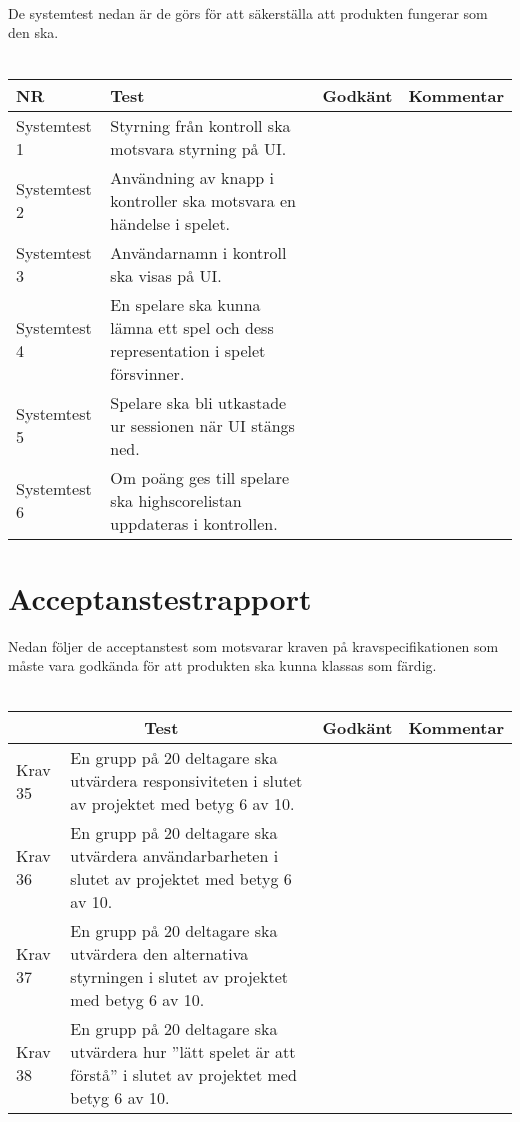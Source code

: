 \documentclass[10pt]{article}
\begin{document}
\\ \\ \\
De systemtest nedan är de görs för att säkerställa att produkten fungerar som den ska.
\\ \\
\noindent
	\begin{tabular}{| p{2.1cm}| p{5cm}| p{1.2cm}| p{7cm}|}
      		\hline
      		NR&Test&Godkänt&Kommentar\\
      		\hline
    
		Systemtest 1&Styrning från kontroll ska motsvara styrning på UI.&&\\
		\hline
		Systemtest 2&Användning av knapp i kontroller ska motsvara en händelse i spelet.&&\\
		\hline
		Systemtest 3&Användarnamn i kontroll ska visas på UI.&&\\
		\hline
		Systemtest 4&En spelare ska kunna lämna ett spel och dess representation i spelet försvinner.&&\\
		\hline
		Systemtest 5&Spelare ska bli utkastade ur sessionen när UI stängs ned.&&\\
		\hline
		Systemtest 6&Om poäng ges till spelare ska highscorelistan uppdateras i kontrollen.&&\\
		\hline



   
  \end{tabular}
  
\section{Acceptanstestrapport}
Nedan följer de acceptanstest som motsvarar kraven på kravspecifikationen \cite{bib-kravspec} som måste vara godkända för att produkten ska kunna klassas som färdig.
\\ \\
\noindent
	\begin{tabular}{| p{1.5cm} | p{5cm} | p{1.2cm}| p{7cm}|}
	
  \hline
    \multicolumn{2}{|c|}{Test}&{Godkänt}&{Kommentar}\\
    \hline


		Krav 35& En grupp på 20 deltagare ska utvärdera responsiviteten i slutet av projektet med betyg 6 av 10.&& \\
		\hline
		Krav 36& En grupp på 20 deltagare ska utvärdera användarbarheten i slutet av projektet med betyg 6 av 10.&& \\
		\hline
		Krav 37& En grupp på 20 deltagare ska utvärdera den alternativa styrningen i slutet av projektet med betyg 6 av 10.&& \\
		\hline
		Krav 38& En grupp på 20 deltagare ska utvärdera hur ''lätt spelet är att förstå'' i slutet av projektet med betyg 6 av 10.&& \\
		\hline

   
  \end{tabular}
  
\pagebreak
\printbibliography	
	
\end{document}

